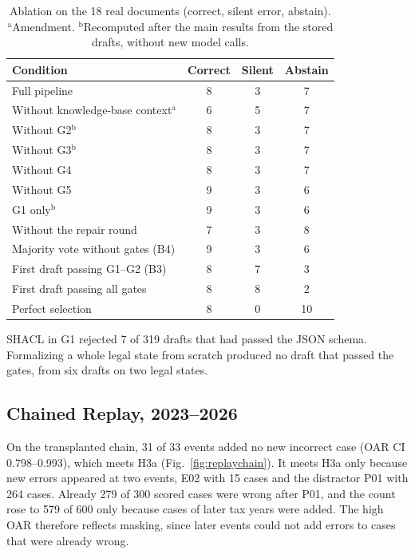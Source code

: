 \begin{table}[!t]
\caption{Ablation on the 18 real documents (correct, silent error, abstain). $^{\mathrm{a}}$Amendment. $^{\mathrm{b}}$Recomputed after the main results from the stored drafts, without new model calls.}
\label{tab:ablation}
\centering\footnotesize
\setlength{\tabcolsep}{3pt}
\begin{tabularx}{\columnwidth}{@{}Lccc@{}}
\toprule
Condition & Correct & Silent & Abstain \\
\midrule
Full pipeline & 8 & 3 & 7 \\
Without knowledge-base context$^{\mathrm{a}}$ & 6 & 5 & 7 \\
Without G2$^{\mathrm{b}}$ & 8 & 3 & 7 \\
Without G3$^{\mathrm{b}}$ & 8 & 3 & 7 \\
Without G4 & 8 & 3 & 7 \\
Without G5 & 9 & 3 & 6 \\
G1 only$^{\mathrm{b}}$ & 9 & 3 & 6 \\
Without the repair round & 7 & 3 & 8 \\
Majority vote without gates (B4) & 9 & 3 & 6 \\
First draft passing G1--G2 (B3) & 8 & 7 & 3 \\
First draft passing all gates & 8 & 8 & 2 \\
Perfect selection & 8 & 0 & 10 \\
\bottomrule
\end{tabularx}
\begin{minipage}{\columnwidth}\vspace{2pt}\scriptsize
SHACL in G1 rejected 7 of 319 drafts that had passed the JSON schema. Formalizing a whole legal state from scratch produced no draft that passed the gates, from six drafts on two legal states.
\end{minipage}
\end{table}

\subsection{Chained Replay, 2023--2026}
\label{sec:res-chain}
On the transplanted chain, 31 of 33 events added no new incorrect case (OAR CI 0.798--0.993), which meets H3a (Fig.~\ref{fig:replaychain}). It meets H3a only because new errors appeared at two events, E02 with 15 cases and the distractor P01 with 264 cases. Already 279 of 300 scored cases were wrong after P01, and the count rose to 579 of 600 only because cases of later tax years were added. The high OAR therefore reflects masking, since later events could not add errors to cases that were already wrong.

